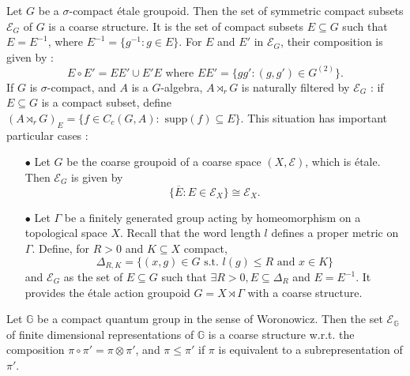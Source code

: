 \begin{Expl}
Let $G$ be a $\sigma$-compact étale groupoid. Then the set of symmetric compact subsets $\mathcal E_G$ of $G$ is a coarse structure. It is the set of compact subsets $E\subseteq G$ such that $E=E^{-1}$, where $E^{-1} = \{g^{-1} : g\in E\}$. For $E$ and $E'$ in $\mathcal E_G$, their composition is given by :
\[E\circ E' = EE' \cup E'E \text{ where }EE' = \{gg' : (g,g')\in G^{(2)}\}.\] 
If $G$ is $\sigma$-compact, and $A$ is a $G$-algebra, $A\rtimes_r G$ is naturally filtered by $\mathcal E_G$ : if $E\subseteq G$ is a compact subset, define $(A\rtimes_r G)_E = \{f\in C_c(G,A) : \text{ supp}(f)\subseteq E\}$. This situation has important particular cases :
\begin{itemize}
\item[$\bullet$] Let $G$ be the coarse groupoid of a coarse space $(X,\mathcal E)$, which is étale. Then $\mathcal E_G$ is given by \[\{\overline{E} : E\in\mathcal E_X\} \cong \mathcal E_X.\] 
\item[$\bullet$] Let $\Gamma$ be a finitely generated group acting by homeomorphism on a topological space $X$. Recall that the word length $l$ defines a proper metric on $\Gamma$. Define, for $R>0$ and $K\subseteq X$ compact, 
\[\Delta_{R,K} = \{(x,g)\in G \text{ s.t. } l(g)\leq R \text{ and } x\in K\}\] 
and $\mathcal E_G $ as the set of $E\subseteq G$ such that $\exists R>0, E\subseteq \Delta_R$ and $E = E^{-1}$. It provides the étale action groupoid $G=X\rtimes \Gamma$ with a coarse structure.
\end{itemize}
\end{Expl}

\begin{Expl}
Let $\mathbb G$ be a compact quantum group in the sense of Woronowicz. Then the set $\mathcal E_{\mathbb G}$ of finite dimensional representations of $\mathbb G$ is a coarse structure w.r.t. the composition $\pi\circ \pi'=\pi\otimes \pi'$, and $\pi\leq\pi'$ if $\pi$ is equivalent to a subrepresentation of $\pi'$.
\end{Expl}


